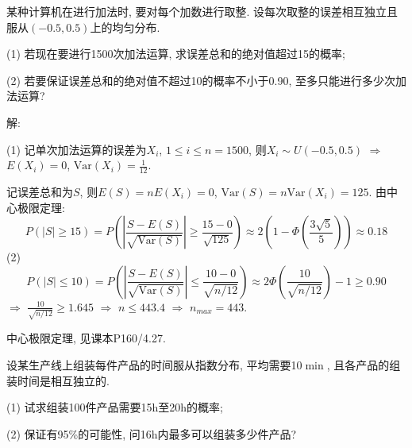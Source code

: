 \documentclass[standard]{ExBook}
\renewenvironment{shaded}{%
  \def\FrameCommand{\fboxsep=\FrameSep \colorbox{shadecolor}}%
  \MakeFramed{\advance\hsize-\width \FrameRestore}%
}{%
  \endMakeFramed
}
\begin{document}
\begin{qitems}
\vspace{2.5cm-5em}

    \begin{bbox}
    \begin{shaded}
        \qitem
某种计算机在进行加法时, 要对每个加数进行取整. 设每次取整的误差相互独立且服从$(-0.5,0.5)$上的均匀分布.

(1) 若现在要进行1500次加法运算, 求误差总和的绝对值超过15的概率;

(2) 若要保证误差总和的绝对值不超过10的概率不小于0.90, 至多只能进行多少次加法运算?
    \end{shaded}
    \end{bbox}

\vspace{\dimexpr2.5cm-5em\relax}

解: 

(1) 记单次加法运算的误差为$X_i$, $1\leq i\leq n=1500$, 则$X_i\sim U(-0.5,0.5)$ $\Longrightarrow$ $E(X_i)=0$, $\mathrm{Var}(X_i)=\displaystyle\frac{1}{12}$.

记误差总和为$S$, 则$E(S)=nE(X_i)=0$, $\mathrm{Var}(S)=n\mathrm{Var}(X_i)=125$. 由中心极限定理:
$$\displaystyle P(|S|\geq 15)=P\left(\left|\frac{S-E(S)}{\sqrt{\mathrm{Var}(S)}}\right| \geq \frac{15-0}{\sqrt{125}}\right) \approx 2\left(1-\Phi\left(\frac{3\sqrt{5}}{5}\right)\right) \approx 0.18$$
(2) $$\displaystyle P(|S|\leq 10)=P\left(\left|\frac{S-E(S)}{\sqrt{\mathrm{Var}(S)}}\right| \leq \frac{10-0}{\sqrt{n/12}}\right) \approx 2\Phi\left(\frac{10}{\sqrt{n/12}}\right)-1 \geq 0.90$$
$\Longrightarrow$ $\displaystyle\frac{10}{\sqrt{n/12}} \geq 1.645$ $\Longrightarrow$ $n\leq 443.4$ $\Longrightarrow$ $n_{max}=443$.

\textcolor{themeColor}{\selectfont {} 中心极限定理, 见课本P160/4.27.}

\vspace{2.5cm-5em}

    \begin{bbox}
    \begin{shaded}
        \qitem
设某生产线上组装每件产品的时间服从指数分布, 平均需要10$\min$, 且各产品的组装时间是相互独立的.

(1) 试求组装100件产品需要15h至20h的概率;

(2) 保证有95\%的可能性, 问16h内最多可以组装多少件产品?
    \end{shaded}
    \end{bbox}

\vspace{\dimexpr2.5cm-5em\relax}


\end{qitems}
\end{document}
